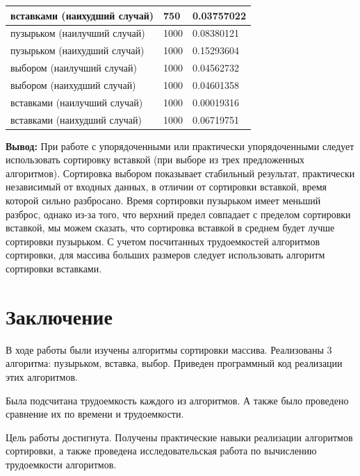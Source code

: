 \documentclass[12pt]{report}
\begin{document}
\begin{table}[H]
\begin{center}
\begin{tabular}{ | l | l | l | }
			вставками (наихудший случай) & 750 & 0.03757022 \\
			\hline
									пузырьком (наилучший случай) & 1000 & 0.08380121 \\
			пузырьком (наихудший случай) & 1000 & 0.15293604 \\
			выбором (наилучший случай) & 1000 & 0.04562732 \\
			выбором (наихудший случай) & 1000 & 0.04601358 \\
			вставками (наилучший случай) & 1000 & 0.00019316 \\
			вставками (наихудший случай) & 1000 & 0.06719751 \\
			\hline
		\end{tabular}
	\end{center}
\end{table} 

\newpage

\textbf{Вывод: } 
При работе с упорядоченными или практически упорядоченными следует использовать сортировку вставкой (при выборе из трех предложенных алгоритмов). Сортировка выбором показывает стабильный результат, практически независимый от входных данных, в отличии от сортировки вставкой, время которой сильно разбросано. Время сортировки пузырьком имеет меньший разброс, однако из-за того, что верхний предел совпадает с пределом сортировки вставкой, мы можем сказать, что сортировка вставкой в среднем будет лучше сортировки пузырьком. С учетом посчитанных трудоемкостей алгоритмов сортировки, для массива больших размеров следует использовать алгоритм сортировки вставками.

\chapter*{Заключение}

В ходе работы были изучены алгоритмы сортировки массива. Реализованы 3 алгоритма: пузырьком, вставка, выбор. Приведен программный код реализации этих алгоритмов.

Была подсчитана трудоемкость каждого из алгоритмов. А также было проведено сравнение их по времени и трудоемкости.

Цель работы достигнута. Получены практические навыки реализации алгоритмов сортировки, а также проведена исследовательская работа по вычислению трудоемкости алгоритмов.
\end{document}
